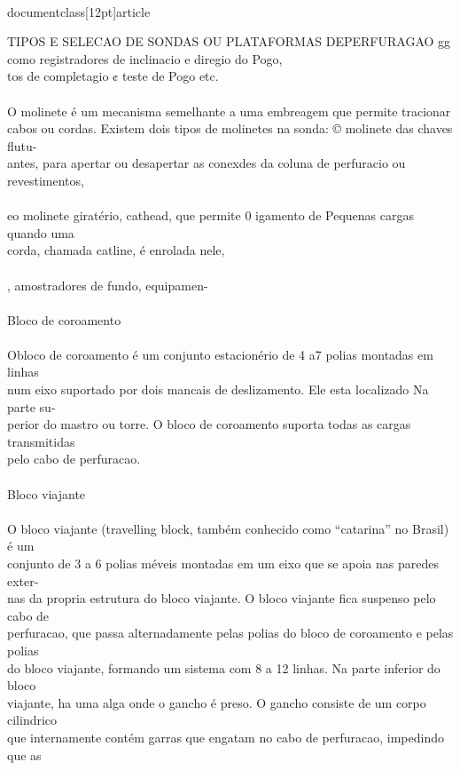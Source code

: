 \\documentclass[12pt]{article}
\begin{document}
TIPOS E SELECAO DE SONDAS OU PLATAFORMAS DEPERFURAGAO gg\\
como registradores de inclinacio e diregio do Pogo,\\
tos de completagio ¢ teste de Pogo etc.\\
\\
O molinete é um mecanisma semelhante a uma embreagem que permite tracionar\\
cabos ou cordas. Existem dois tipos de molinetes na sonda: © molinete das chaves flutu-\\
antes, para apertar ou desapertar as conexdes da coluna de perfuracio ou revestimentos,\\
\\
eo molinete giratério, cathead, que permite 0 igamento de Pequenas cargas quando uma\\
corda, chamada catline, é enrolada nele,\\
\\
, amostradores de fundo, equipamen-\\
\\
Bloco de coroamento\\
\\
Obloco de coroamento é um conjunto estacionério de 4 a7 polias montadas em linhas\\
num eixo suportado por dois mancais de deslizamento. Ele esta localizado Na parte su-\\
perior do mastro ou torre. O bloco de coroamento suporta todas as cargas transmitidas\\
pelo cabo de perfuracao.\\
\\
Bloco viajante\\
\\
O bloco viajante (travelling block, também conhecido como “catarina” no Brasil) é um\\
conjunto de 3 a 6 polias méveis montadas em um eixo que se apoia nas paredes exter-\\
nas da propria estrutura do bloco viajante. O bloco viajante fica suspenso pelo cabo de\\
perfuracao, que passa alternadamente pelas polias do bloco de coroamento e pelas polias\\
do bloco viajante, formando um sistema com 8 a 12 linhas. Na parte inferior do bloco\\
viajante, ha uma alga onde o gancho é preso. O gancho consiste de um corpo cilindrico\\
que internamente contém garras que engatam no cabo de perfuracao, impedindo que as\\
\end{document}

